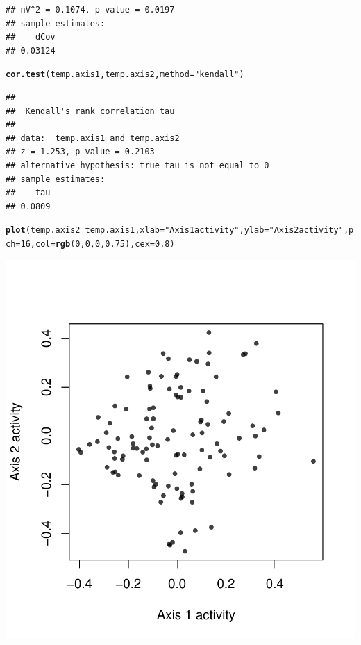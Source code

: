 \documentclass{article}\usepackage[]{graphicx}\usepackage[]{color}
\makeatletter
\def\maxwidth{ %
  \ifdim\Gin@nat@width>\linewidth
    \linewidth
  \else
    \Gin@nat@width
  \fi
}
\newcommand{\hlnum}[1]{\textcolor[rgb]{0.686,0.059,0.569}{#1}}%
\newcommand{\hlstr}[1]{\textcolor[rgb]{0.192,0.494,0.8}{#1}}%
\newcommand{\hlopt}[1]{\textcolor[rgb]{0,0,0}{#1}}%
\newcommand{\hlstd}[1]{\textcolor[rgb]{0.345,0.345,0.345}{#1}}%
\newcommand{\hlkwc}[1]{\textcolor[rgb]{0.333,0.667,0.333}{#1}}%
\newcommand{\hlkwd}[1]{\textcolor[rgb]{0.737,0.353,0.396}{\textbf{#1}}}%
\newenvironment{kframe}{%
 \def\at@end@of@kframe{}%
 \ifinner\ifhmode%
  \def\at@end@of@kframe{\end{minipage}}%
  \begin{minipage}{\columnwidth}%
 \fi\fi%
 \def\FrameCommand##1{\hskip\@totalleftmargin \hskip-\fboxsep
 \colorbox{shadecolor}{##1}\hskip-\fboxsep
     \hskip-\linewidth \hskip-\@totalleftmargin \hskip\columnwidth}%
 \MakeFramed {\advance\hsize-\width
   \@totalleftmargin\z@ \linewidth\hsize
   \@setminipage}}%
 {\par\unskip\endMakeFramed%
 \at@end@of@kframe}
\newenvironment{knitrout}{}{} %
\makeatother
\begin{document}
\begin{knitrout}
\begin{kframe}
\begin{verbatim}
## nV^2 = 0.1074, p-value = 0.0197
## sample estimates:
##    dCov 
## 0.03124
\end{verbatim}
\begin{alltt}
\hlkwd{cor.test}\hlstd{(temp.axis1, temp.axis2,} \hlkwc{method} \hlstd{=} \hlstr{"kendall"}\hlstd{)}
\end{alltt}
\begin{verbatim}
## 
## 	Kendall's rank correlation tau
## 
## data:  temp.axis1 and temp.axis2
## z = 1.253, p-value = 0.2103
## alternative hypothesis: true tau is not equal to 0
## sample estimates:
##    tau 
## 0.0809
\end{verbatim}
\begin{alltt}
\hlkwd{plot}\hlstd{(temp.axis2} \hlopt{~} \hlstd{temp.axis1,} \hlkwc{xlab} \hlstd{=} \hlstr{"Axis 1 activity"}\hlstd{,} \hlkwc{ylab} \hlstd{=} \hlstr{"Axis 2 activity"}\hlstd{,} \hlkwc{pch} \hlstd{=} \hlnum{16}\hlstd{,} \hlkwc{col} \hlstd{=} \hlkwd{rgb}\hlstd{(}\hlnum{0}\hlstd{,} \hlnum{0}\hlstd{,} \hlnum{0}\hlstd{,} \hlnum{0.75}\hlstd{),} \hlkwc{cex} \hlstd{=} \hlnum{0.8}\hlstd{)}
\end{alltt}
\end{kframe}

{\centering \includegraphics[width=\maxwidth]{figure/metagene-pairs-10} 

}
\end{knitrout}
\end{document}
